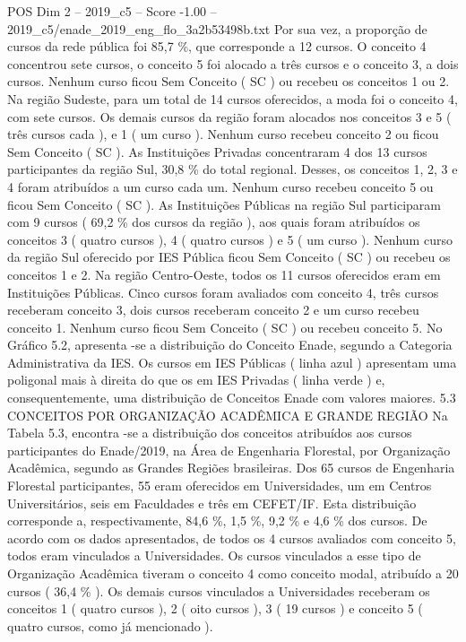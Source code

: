 \begin{textsample}{POS Dim 2 – 2019\_c5 – Score -1.00 – 2019\_c5/enade\_2019\_eng\_flo\_3a2b53498b.txt}
Por sua vez, a proporção de cursos da rede pública foi 85,7 \%, que corresponde a 12 cursos.
O conceito 4 concentrou sete cursos, o conceito 5 foi alocado a três cursos e o conceito 3, a dois cursos.
Nenhum curso ficou Sem Conceito ( SC ) ou recebeu os conceitos 1 ou 2.
Na região Sudeste, para um total de 14 cursos oferecidos, a moda foi o conceito 4, com sete cursos.
Os demais cursos da região foram alocados nos conceitos 3 e 5 ( três cursos cada ), e 1 ( um curso ).
Nenhum curso recebeu conceito 2 ou ficou Sem Conceito ( SC ).
As Instituições Privadas concentraram 4 dos 13 cursos participantes da região Sul, 30,8 \% do total regional.
Desses, os conceitos 1, 2, 3 e 4 foram atribuídos a um curso cada um.
Nenhum curso recebeu conceito 5 ou ficou Sem Conceito ( SC ).
As Instituições Públicas na região Sul participaram com 9 cursos ( 69,2 \% dos cursos da região ), aos quais foram atribuídos os conceitos 3 ( quatro cursos ), 4 ( quatro cursos ) e 5 ( um curso ).
Nenhum curso da região Sul oferecido por IES Pública ficou Sem Conceito ( SC ) ou recebeu os conceitos 1 e 2.
Na região Centro-Oeste, todos os 11 cursos oferecidos eram em Instituições Públicas.
Cinco cursos foram avaliados com conceito 4, três cursos receberam conceito 3, dois cursos receberam conceito 2 e um curso recebeu conceito 1.
Nenhum curso ficou Sem Conceito ( SC ) ou recebeu conceito 5.
No Gráfico 5.2, apresenta -se a distribuição do Conceito Enade, segundo a Categoria Administrativa da IES.
Os cursos em IES Públicas ( linha azul ) apresentam uma poligonal mais à direita do que os em IES Privadas ( linha verde ) e, consequentemente, uma distribuição de Conceitos Enade com valores maiores. 5.3 CONCEITOS POR ORGANIZAÇÃO ACADÊMICA E GRANDE REGIÃO Na Tabela 5.3, encontra -se a distribuição dos conceitos atribuídos aos cursos participantes do Enade/2019, na Área de Engenharia Florestal, por Organização Acadêmica, segundo as Grandes Regiões brasileiras.
Dos 65 cursos de Engenharia Florestal participantes, 55 eram oferecidos em Universidades, um em Centros Universitários, seis em Faculdades e três em CEFET/IF.
Esta distribuição corresponde a, respectivamente, 84,6 \%, 1,5 \%, 9,2 \% e 4,6 \% dos cursos.
De acordo com os dados apresentados, de todos os 4 cursos avaliados com conceito 5, todos eram vinculados a Universidades.
Os cursos vinculados a esse tipo de Organização Acadêmica tiveram o conceito 4 como conceito modal, atribuído a 20 cursos ( 36,4 \% ).
Os demais cursos vinculados a Universidades receberam os conceitos 1 ( quatro cursos ), 2 ( oito cursos ), 3 ( 19 cursos ) e conceito 5 ( quatro cursos, como já mencionado ).

\end{textsample}
